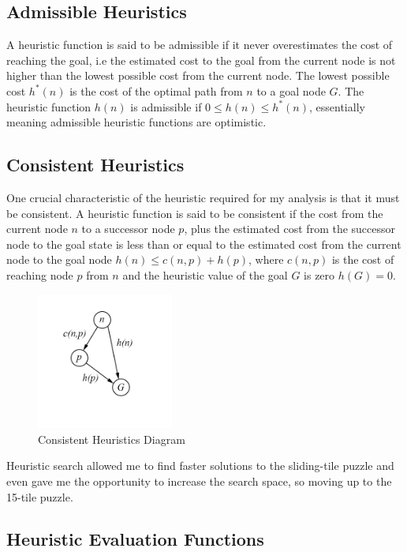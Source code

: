 \documentclass[final]{cmpreport}
\begin{document}
\subsection{Admissible Heuristics}
A heuristic function is said to be admissible if it never overestimates the cost of reaching the goal, i.e the estimated cost to the goal from the current node is not higher than the lowest possible cost from the current node. The lowest possible cost $h^*(n)$ is the cost of the optimal path from $n$ to a goal node $G$. The heuristic function $h(n)$ is admissible if $0 \leq h(n) \leq h^*(n)$, essentially meaning admissible heuristic functions are optimistic.

\subsection{Consistent Heuristics}
One crucial characteristic of the heuristic required for my analysis is that it must be consistent. A heuristic function is said to be consistent if the cost from the current node $n$ to a successor node $p$, plus the estimated cost from the successor node to the goal state is less than or equal to the estimated cost from the current node to the goal node $h(n)\leq c(n,p) + h(p)$, where $c(n,p)$ is the cost of reaching node $p$ from $n$ and the heuristic value of the goal $G$ is zero $h(G)=0$. 


\begin{figure}[ht]
	\centering
	\includegraphics[width=0.4\textwidth]{consistent}
	\captionsetup{justification=centering}
	\caption{Consistent Heuristics Diagram}
\end{figure}



 

Heuristic search allowed me to find faster solutions to the sliding-tile puzzle and even gave me the opportunity to increase the search space, so moving up to the 15-tile puzzle.

\subsection{Heuristic Evaluation Functions}
\end{document}
